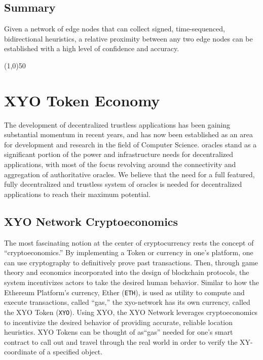 \documentclass{article}
\begin{document}
\subsection {Summary}
Given a network of edge nodes that can collect signed, time-sequenced, bidirectional \glspl{heuristic}, a relative proximity between any two edge nodes can be established with a high level of confidence and \gls{accuracy}.

\begin{center}
\line(1,0){50}
\end{center}

\section {XYO Token Economy}

The development of decentralized trustless applications has been gaining substantial momentum in recent years, and has now been established as an area for development and research in the field of Computer Science. \Glspl{oracle} stand as a significant portion of the power and infrastructure needs for decentralized applications, with most of the focus revolving around the connectivity and aggregation of authoritative oracles. We believe that the need for a full featured, fully decentralized and trustless system of oracles is needed for decentralized applications to reach their maximum potential.

\subsection {XYO Network Cryptoeconomics}
The most fascinating notion at the center of cryptocurrency rests the concept of ``\gls{cryptoeconomics}.'' By implementing a Token or currency in one's platform, one can use cryptography to definitively prove past transactions. Then, through game theory and economics incorporated into the design of blockchain protocols, the system incentivizes actors to take the desired human behavior. Similar to how the Ethereum Platform's currency, Ether (\texttt{ETH}), is used as utility to compute and execute transactions, called ``\gls{gas},'' the \Gls{xyo-network} has its own currency, called the XYO Token (\texttt{XYO}). Using XYO, the XYO Network leverages cryptoeconomics to incentivize the desired behavior of providing accurate, reliable location \glspl{heuristic}. XYO Tokens can be thought of as``gas'' needed for one's smart contract to call out and travel through the real world in order to verify the XY-coordinate of a specified object.
\end{document}

